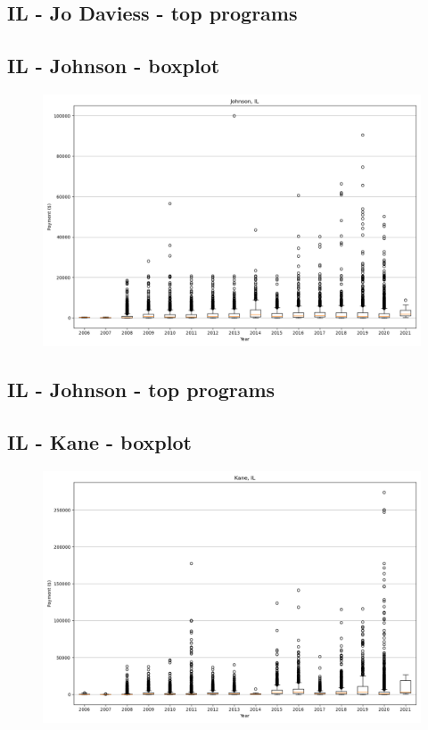 \subsection*{IL - Jo Daviess - top programs}

\newpage
\subsection*{IL - Johnson - boxplot}
\begin{figure}[h]
\centering
\includegraphics[width=7in]{../output/boxplots/counties/Johnson-IL_boxplot.png}
\end{figure}


\subsection*{IL - Johnson - top programs}

\newpage
\subsection*{IL - Kane - boxplot}
\begin{figure}[h]
\centering
\includegraphics[width=7in]{../output/boxplots/counties/Kane-IL_boxplot.png}
\end{figure}


